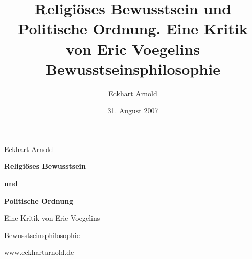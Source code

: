 \documentclass[11pt,a4paper, german]{book}
\begin{document}
\title{Religiöses Bewusstsein und Politische Ordnung. Eine Kritik von Eric
  Voegelins Bewusstseinsphilosophie} 

\author{Eckhart Arnold} 

\date{31. August 2007}


\begin{titlepage}

\setlength{\parindent}{0em}
\begin{flushleft} 

{\Large Eckhart Arnold}

\setlength{\parskip}{2cm}
{\huge\bf Religiöses Bewusstsein}

\setlength{\parskip}{0.5cm}
{\huge\bf und}

\setlength{\parskip}{0.5cm}
{\huge\bf Politische Ordnung}

\setlength{\parskip}{1.0cm}
{\huge Eine Kritik von Eric Voegelins}

\setlength{\parskip}{0.5cm}
{\huge Bewusstseinsphilosophie}

\end{flushleft} 

\begin{center} 

\setlength{\parskip}{11cm}
{\footnotesize www.eckhartarnold.de} 
\end{center}

\end{titlepage}


\newpage

 \tableofcontents

\newpage


\setcounter{page}{1}











\end{document}
